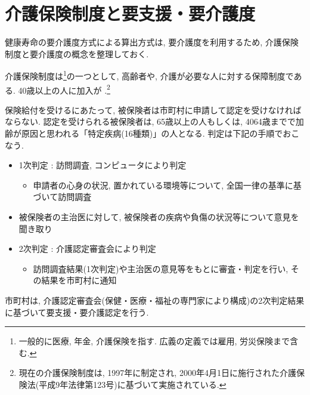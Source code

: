 \section{介護保険制度と要支援・要介護度}
健康寿命の要介護度方式による算出方式は, 要介護度を利用するため, 介護保険制度と要介護度の概念を整理しておく.

介護保険制度は\footnote{一般的に医療, 年金, 介護保険を指す. 広義の定義では雇用, 労災保険まで含む.
}の一つとして,
高齢者や, 介護が必要な人に対する保障制度である.
40歳以上の人に加入が
.\footnote{
	現在の介護保険制度は, 1997年に制定され, 2000年4月1日に施行された介護保険法(平成9年法律第123号)に基づいて実施されている.
}


保険給付を受けるにあたって, 被保険者は市町村に申請して認定を受けなければならない.
認定を受けられる被保険者は, 65歳以上の人もしくは, 4064歳までで加齢が原因と思われる「特定疾病(16種類)」の人となる.
判定は下記の手順でおこなう.
\begin{itemize} \setlength{\itemsep}{-0.5mm} \setlength{\parskip}{-0.5mm}
	\item 1次判定  :  訪問調査, コンピュータにより判定
	      \begin{itemize} \setlength{\itemsep}{-0.5mm} \setlength{\parskip}{-0.5mm}
		      \item 申請者の心身の状況, 置かれている環境等について, 全国一律の基準に基づいて訪問調査
	      \end{itemize}
	\item 被保険者の主治医に対して, 被保険者の疾病や負傷の状況等について意見を聞き取り
	\item 2次判定  :  介護認定審査会により判定
	      \begin{itemize} \setlength{\itemsep}{-0.5mm} \setlength{\parskip}{-0.5mm}
		      \item 訪問調査結果(1次判定)や主治医の意見等をもとに審査・判定を行い, その結果を市町村に通知
	      \end{itemize}
\end{itemize}
市町村は, 介護認定審査会(保健・医療・福祉の専門家により構成)の2次判定結果に基づいて要支援・要介護認定を行う.


